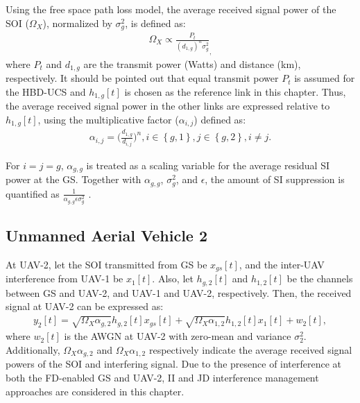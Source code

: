 Using the free space path loss model, the average received signal power of the SOI ($\Omega_{X}$), normalized by $\sigma_g^2$, is defined as:
\begin{eqnarray} \label{HBD_UCS_Rician_Shadowed_Omega_x_soi}
\Omega_{X} \propto \frac{P_t}{(d_{1,g})^{n}\sigma_g^2}_,
\end{eqnarray}
where $P_{t}$ and $d_{1,g}$ are the transmit power (Watts) and distance (km), respectively. It should be pointed out that equal transmit power $P_t$ is assumed for the HBD-UCS and $h_{1,g}[t]$ is chosen as the reference link in this chapter. Thus, the average received signal power in the other links are expressed relative to $h_{1,g}[t]$, using the multiplicative factor ($\alpha_{i,j}$) defined as:
\begin{eqnarray} \label{HBD_UCS_Rician_Shadowed_alpha_i_j}
\alpha_{i,j} = \bigg(\frac{d_{1,g}}{d_{i,j}}\bigg)^n, i\in\left\{g,1\right\}, j\in\left\{g,2\right\}, i \neq j.
\end{eqnarray}

For $i=j=g$, $\alpha_{g,g}$ is treated as a scaling variable for the average residual SI power at the GS. Together with $\alpha_{g,g}$, $\sigma_g^2$, and $\epsilon$, the amount of SI suppression is quantified as $\frac{1}{\alpha_{g,g}\epsilon\sigma_g^2}$ \cite{ernest2019outage,zlatanov2017capacity}.

\subsection{Unmanned Aerial Vehicle 2}
At UAV-2, let the SOI transmitted from GS be $x_{gs}[t]$, and the inter-UAV interference from UAV-1 be $x_1[t]$. Also, let $h_{g,2}[t]$ and $h_{1,2}[t]$ be the channels between GS and UAV-2, and UAV-1 and UAV-2, respectively. Then, the received signal at UAV-2 can be expressed as:
\begin{eqnarray} \label{HBD_UCS_Rician_Shadowed_y_uav2}
y_{2}[t] = \sqrt{\Omega_{X}\alpha_{g,2}}h_{g,2}[t]x_{gs}[t] + \sqrt{\Omega_{X}\alpha_{1,2}}h_{1,2}[t]x_{1}[t]  +  w_{2}[t],
\end{eqnarray}
where $w_{2}[t]$ is the AWGN at UAV-2 with zero-mean and variance $\sigma_2^2$. Additionally, $\Omega_{X}\alpha_{g,2}$ and $\Omega_{X}\alpha_{1,2}$ respectively indicate the average received signal powers of the SOI and interfering signal. Due to the presence of interference at both the FD-enabled GS and UAV-2, II and JD interference management approaches are considered in this chapter.


